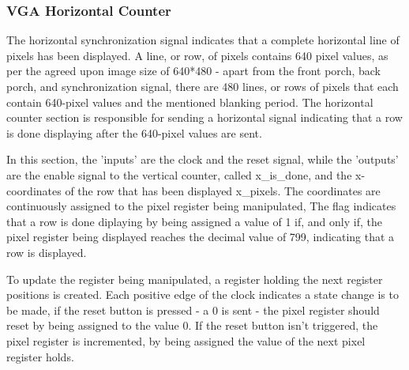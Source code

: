 \subsubsection{VGA Horizontal Counter}
\par The horizontal synchronization signal indicates that a complete horizontal line of pixels has been displayed. A line, or row, of pixels contains 640 pixel values, as per the agreed upon image size of 640*480 - apart from the front porch, back porch, and synchronization signal, there are 480 lines, or rows of pixels that each contain 640-pixel values and the mentioned blanking period. The horizontal counter section is responsible for sending a horizontal signal indicating that a row is done displaying after the 640-pixel values are sent. \newline
\par In this section, the 'inputs' are the clock and the reset signal, while the 'outputs' are the enable signal to the vertical counter, called x\_is\_done, and the x-coordinates of the row that has been displayed x\_pixels. The coordinates are continuously assigned to the pixel register being manipulated, The flag indicates that a row is done diplaying by being assigned a value of 1 if, and only if, the pixel register being displayed reaches the decimal value of 799, indicating that a row is displayed. \newline
\par To update the register being manipulated, a register holding the next register positions is created. Each positive edge of the clock indicates a state change is to be made, if the reset button is pressed - a 0 is sent - the pixel register should reset by being assigned to the value 0. If the reset button isn't triggered, the pixel register is incremented, by being assigned the value of the next pixel register holds. \newline

